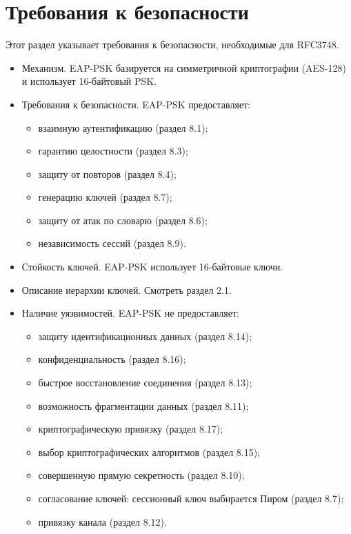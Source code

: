 \newpage
\section{Требования к безопасности}

Этот раздел указывает требования к безопасности, необходимые для RFC3748.

\begin{itemize}
\item Механизм. EAP-PSK базируется на симметричной криптографии (AES-128) и использует 16-байтовый PSK.
\item Требования к безопасности. EAP-PSK предоставляет:
\begin{itemize}
\item взаимную аутентификацию (раздел 8.1);
\item гарантию целостности (раздел 8.3);
\item защиту от повторов (раздел 8.4);
\item генерацию ключей (раздел 8.7);
\item защиту от атак по словарю (раздел 8.6);
\item независимость сессий (раздел 8.9).
\end{itemize}
\item Стойкость ключей. EAP-PSK использует 16-байтовые ключи.
\item Описание иерархии ключей. Смотреть раздел 2.1.
\item Наличие уязвимостей. EAP-PSK не предоставляет:
\begin{itemize}
\item защиту идентификационных данных (раздел 8.14);
\item конфиденциальность (раздел 8.16);
\item быстрое восстановление соединения (раздел 8.13);
\item возможность фрагментации данных (раздел 8.11);
\item криптографическую привязку (раздел 8.17);
\item выбор криптографических алгоритмов (раздел 8.15);
\item совершенную прямую секретность (раздел 8.10);
\item согласование ключей: сессионный ключ выбирается Пиром (раздел 8.7);
\item привязку канала (раздел 8.12).
\end{itemize}
\end{itemize}
